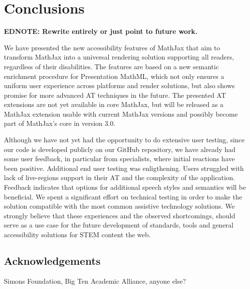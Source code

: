 \documentclass{sig-alternate}
\newcommand\edbf[1]{\typeout{There is still an editor's note!!!}%
  \textbf{EDNOTE: #1}}
\begin{document}
\section{Conclusions}
\label{sec:conc}

\edbf{Rewrite entirely or just point to future work.}

We have presented the new accessibility features of MathJax that aim to
transform MathJax into a universal rendering solution supporting all readers,
regardless of their disabilities. The features are based on a new semantic
enrichment procedure for Presentation MathML, which not only ensures a uniform
user experience across platforms and render solutions, but also shows promise
for more advanced AT techniques in the future. The presented AT extensions are
not yet available in core MathJax, but will be released as a MathJax extension
usable with current MathJax versions and possibly become part of MathJax's core
in version 3.0.



Although we have not yet had the opportunity to do extensive user testing, since
our code is developed publicly on our GitHub repository, we have already had
some user feedback, in particular from specialists, where initial reactions have
been positive. Additional end user testing was enligthening. Users struggled 
with lack of live-regions support in their AT and the complexity of the 
application. Feedback indicates that options for additional speech styles and 
semantics will be beneficial. 
We spent a significant effort on
technical testing in order to make the solution compatible with the most common
assistive technology solutions. 
We strongly believe that these experiences and
the observed shortcomings, should serve as a use case for the future development
of standards, tools and general accessibility solutions for STEM content the
web. 


\subsection*{Acknowledgements}
Simons Foundation, Big Ten Academic Alliance, anyone else?
\end{document}
